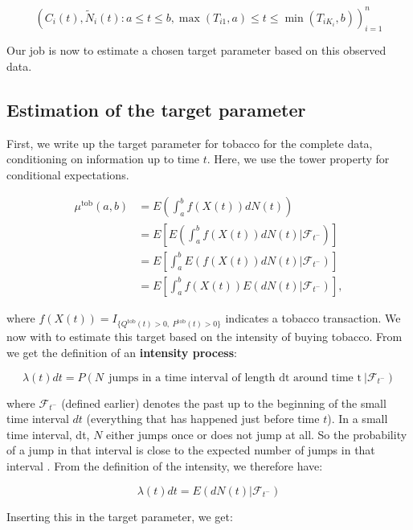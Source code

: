\documentclass[
  11pt,
]{article}
\begin{document}
\[
(C_i(t), \tilde{N}_i(t): a \leq t \leq b, \max(T_{i1},a) \leq t \leq \min(T_{iK_i},b))_{i=1}^n
\]

Our job is now to estimate a chosen target parameter based on this
observed data.

\newpage

\hypertarget{estimation-of-the-target-parameter}{%
\subsection{Estimation of the target
parameter}\label{estimation-of-the-target-parameter}}

First, we write up the target parameter for tobacco for the complete
data, conditioning on information up to time \(t\). Here, we use the
tower property for conditional expectations.

\begin{align*}
\mu^{\text{tob}}(a, b) &= E(\int_a^b f(X(t)) dN(t))\\ 
&= E \left[ E(\int_a^b f(X(t)) dN(t) | \mathcal{F}_{t^-}) \right] \\
&= E \left[\int_a^b E(f(X(t)) dN(t) | \mathcal{F}_{t^-}) \right] \\
&= E \left[\int_a^b f(X(t)) E(dN(t) | \mathcal{F}_{t^-}) \right], 
\end{align*}

where
\(f(X(t)) = I_{\{Q^{\text{tob}}(t) > 0, \ P^{\text{tob}}(t) > 0 \}}\)
indicates a tobacco transaction. We now with to estimate this target
based on the intensity of buying tobacco. From \cite{gill84} we get the
definition of an \textbf{intensity process}:

\begin{equation}
\label{intensity}
\lambda (t) dt =P(N \ \ \text{jumps in a time interval of length dt around time t} \ |  \mathcal{F}_{t^-})
\end{equation}

where \(\mathcal{F}_{t^-}\) (defined earlier) denotes the past up to the
beginning of the small time interval \(dt\) (everything that has
happened just before time \(t\)). In a small time interval, dt, \(N\)
either jumps once or does not jump at all. So the probability of a jump
in that interval is close to the expected number of jumps in that
interval \cite{gill84}. From the definition of the intensity, we
therefore have:

\[
\lambda (t) dt = E(dN(t)| \mathcal{F}_{t^-})
\]

Inserting this in the target parameter, we get:
\end{document}
